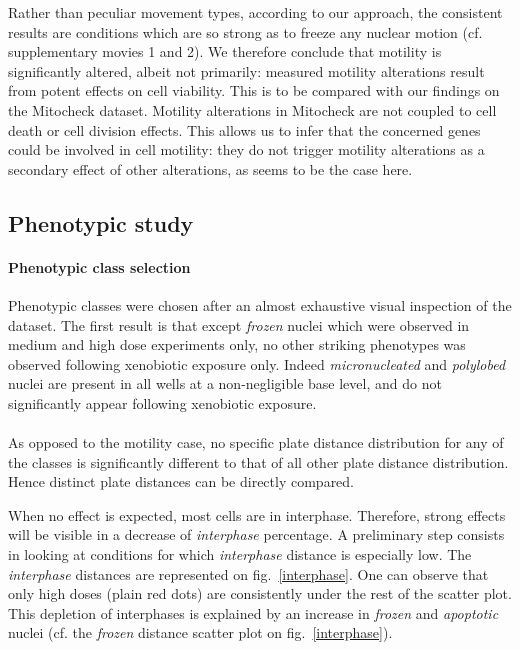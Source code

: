 Rather than peculiar movement types, according to our approach, the consistent results are conditions which are so strong as to freeze any nuclear motion (cf. supplementary movies 1 and 2). We therefore conclude that motility is significantly altered, albeit not primarily: measured motility alterations result from potent effects on cell viability. This is to be compared with our findings on the Mitocheck dataset. Motility alterations in Mitocheck are not coupled to cell death or cell division effects. This allows us to infer that the concerned genes could be involved in cell motility: they do not trigger motility alterations as a secondary effect of other alterations, as seems to be the case here.

\subsection{Phenotypic study}
\paragraph{Phenotypic class selection}
Phenotypic classes were chosen after an almost exhaustive visual inspection of the dataset. The first result is that except \textit{frozen} nuclei which were observed in medium and high dose experiments only, no other striking phenotypes was observed following xenobiotic exposure only. Indeed \textit{micronucleated} and \textit{polylobed} nuclei are present in all wells at a non-negligible base level, and do not significantly appear following xenobiotic exposure.

\paragraph*{}
As opposed to the motility case, no specific plate distance distribution for any of the classes is significantly different to that of all other plate distance distribution. Hence distinct plate distances can be directly compared. 

When no effect is expected, most cells are in interphase. Therefore, strong effects will be visible in a decrease of \textit{interphase} percentage. A preliminary step consists in looking at conditions for which \textit{interphase} distance is especially low. The \textit{interphase} distances are represented on fig.~\ref{interphase}. One can observe that only high doses (plain red dots) are consistently under the rest of the scatter plot. This depletion of interphases is explained by an increase in \textit{frozen} and \textit{apoptotic} nuclei (cf. the \textit{frozen} distance scatter plot on fig.~\ref{interphase}).

